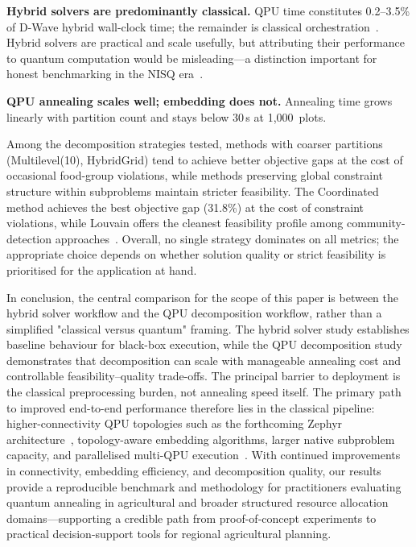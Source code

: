 \documentclass[conference]{IEEEtran}
\begin{document}
\textbf{Hybrid solvers are predominantly classical.}
QPU time constitutes 0.2--3.5\% of D-Wave hybrid wall-clock time; the remainder is classical orchestration~\cite{dwave:solver_properties_all}.
Hybrid solvers are practical and scale usefully, but attributing their performance to quantum computation would be misleading---a distinction important for honest benchmarking in the NISQ era~\cite{preskillQuantumComputingNISQ2018, boothler2022benchmarking}.

\textbf{QPU annealing scales well; embedding does not.}
Annealing time grows linearly with partition count and stays below 30\,s at 1{,}000~plots.

Among the decomposition strategies tested, methods with coarser partitions (Multilevel(10), HybridGrid) tend to achieve better objective gaps at the cost of occasional food-group violations, while methods preserving global constraint structure within subproblems maintain stricter feasibility.
The Coordinated method achieves the best objective gap (31.8\%) at the cost of constraint violations, while Louvain offers the cleanest feasibility profile among community-detection approaches~\cite{blondel2008fast}.
Overall, no single strategy dominates on all metrics; the appropriate choice depends on whether solution quality or strict feasibility is prioritised for the application at hand.

In conclusion, the central comparison for the scope of this paper is between the hybrid solver workflow and the QPU decomposition workflow, rather than a simplified "classical versus quantum" framing. The hybrid solver study establishes baseline behaviour for black-box execution, while the QPU decomposition study demonstrates that decomposition can scale with manageable annealing cost and controllable feasibility--quality trade-offs. The principal barrier to deployment is the classical preprocessing burden, not annealing speed itself. The primary path to improved end-to-end performance therefore lies in the classical pipeline: higher-connectivity QPU topologies such as the forthcoming Zephyr architecture~\cite{boothby2021zephyr}, topology-aware embedding algorithms, larger native subproblem capacity, and parallelised multi-QPU execution~\cite{pelofske2021parallel}. With continued improvements in connectivity, embedding efficiency, and decomposition quality, our results provide a reproducible benchmark and methodology for practitioners evaluating quantum annealing in agricultural and broader structured resource allocation domains---supporting a credible path from proof-of-concept experiments to practical decision-support tools for regional agricultural planning.




\end{document}
